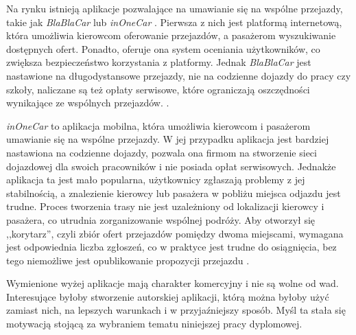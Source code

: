 Na rynku istnieją aplikacje pozwalające na umawianie się na wspólne przejazdy, takie jak \emph{BlaBlaCar} lub \emph{inOneCar} \cite{CARPOOL_ALL}. 
Pierwsza z nich jest platformą internetową, która umożliwia kierowcom oferowanie przejazdów, a pasażerom wyszukiwanie dostępnych ofert. 
Ponadto, oferuje ona system oceniania użytkowników, co zwiększa bezpieczeństwo korzystania z platformy.
Jednak \emph{BlaBlaCar} jest nastawione na długodystansowe przejazdy, nie na codzienne dojazdy do pracy czy szkoły, 
naliczane są też opłaty serwisowe, które ograniczają oszczędności wynikające ze wspólnych przejazdów. \cite{TOCBlaBlaCar}.

\emph{inOneCar} to aplikacja mobilna, która umożliwia kierowcom i pasażerom umawianie się na wspólne przejazdy. 
W jej przypadku aplikacja jest bardziej nastawiona na codzienne dojazdy, pozwala ona firmom na stworzenie sieci dojazdowej 
dla swoich pracowników i nie posiada opłat serwisowych. Jednakże aplikacja ta jest mało popularna, 
użytkownicy zgłaszają problemy z jej stabilnością, a znalezienie kierowcy lub pasażera w pobliżu miejsca odjazdu jest trudne. 
Proces tworzenia trasy nie jest uzależniony od lokalizacji kierowcy i pasażera, co utrudnia zorganizowanie wspólnej podróży. 
Aby otworzył się ,,korytarz'', czyli zbiór ofert przejazdów pomiędzy dwoma miejscami, 
wymagana jest odpowiednia liczba zgłoszeń, co w praktyce jest trudne do osiągnięcia, bez tego niemożliwe jest opublikowanie propozycji przejazdu \cite{WebIOC}.

Wymienione wyżej aplikacje mają charakter komercyjny i nie są wolne od wad. 
Interesujące byłoby stworzenie autorskiej aplikacji, którą można byłoby użyć zamiast nich, na lepszych warunkach i w przyjaźniejszy sposób. 
Myśl ta stała się motywacją stojącą za wybraniem tematu niniejszej pracy dyplomowej.




